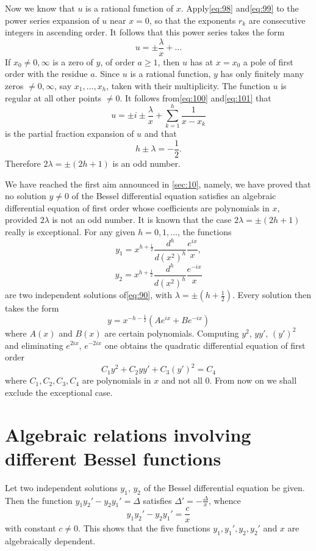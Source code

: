 Now we know that $u$ is a rational function of $x$. Apply\eqref{eq:98} and\eqref{eq:99} to the power series expansion of $u$ near $x=0$, so that the exponents $r_k$ are consecutive integers in ascending order. It follows that this power series takes the form
\begin{equation}
u = \pm \frac{\lambda}{x} + \dots \tag{101}\label{eq:101}
\end{equation}
If $x_0 \neq 0, \infty$ is a zero of $y$, of order $a \ge 1$, then $u$ has at $x=x_0$ a pole of first order with the residue $a$. Since $u$ is a rational function, $y$ has only finitely many zeros $\neq 0, \infty$, say $x_1, \dots, x_h$, taken with their multiplicity. The function $u$ is regular at all other points $\neq 0$. It follows from\eqref{eq:100} and\eqref{eq:101} that
\[u = \pm i \pm \frac{\lambda}{x} + \sum_{k=1}^{h} \frac{1}{x-x_k}\]
is the partial fraction expansion of $u$ and that
\[h \pm \lambda = -\frac{1}{2}.\]
Therefore $2\lambda = \pm (2h+1)$ is an odd number.

We have reached the first aim announced in \autoref{sec:10}, namely, we have proved that no solution $y \neq 0$ of the Bessel differential equation satisfies an algebraic differential equation of first order whose coefficients are polynomials in $x$, provided $2\lambda$ is not an odd number. It is known that the case $2\lambda = \pm (2h+1)$ really is exceptional. For any given $h=0,1,\dots$, the functions
\[y_{1} = x^{h+\frac{1}{2}} \frac{d^{h}}{d(x^{2})^{h}} \frac{e^{ix}}{x},\]
\[y_{2} = x^{h+\frac{1}{2}} \frac{d^{h}}{d(x^{2})^{h}} \frac{e^{-ix}}{x}\]
are two independent solutions of\eqref{eq:90}, with $\lambda = \pm (h + \frac{1}{2})$. Every solution then takes the form
\[y = x^{-h-\frac{1}{2}} (Ae^{ix} + Be^{-ix})\]
where $A(x)$ and $B(x)$ are certain polynomials. Computing $y^2$, $yy'$, $(y')^2$ and eliminating $e^{2ix}$, $e^{-2ix}$ one obtains the quadratic differential equation of first order
\[C_1 y^2 + C_2 yy' + C_3 (y')^2 = C_4\]
where $C_1, C_2, C_3, C_4$ are polynomials in $x$ and not all 0. From now on we shall exclude the exceptional case.

\section{Algebraic relations involving different Bessel functions}\label{sec:12}

Let two independent solutions $y_1$, $y_2$ of the Bessel differential equation be given. Then the function $y_1 y_2' - y_2 y_1' = \Delta$ satisfies $\Delta' = -\frac{\Delta}{x}$, whence
\begin{equation}
y_1 y_2' - y_2 y_1' = \frac{c}{x} \tag{102}\label{eq:102}
\end{equation}
with constant $c \neq 0$. This shows that the five functions $y_1, y_1', y_2, y_2'$ and $x$ are algebraically dependent.

